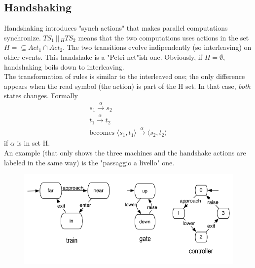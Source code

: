 \documentclass{article}
\begin{document}
			\subsection{Handshaking}
				Handshaking introduces "synch actions" that makes parallel computations synchronize. $TS_1 \,\vert\vert\,_{H} TS_2$ means that the two computations uses actions in the set $H = \subseteq Act_1 \cap Act_2$. The two transitions evolve indipendently (so interleaving) on other events. This handshake is a "Petri net"ish one. Obviously, if $H = \emptyset$, handshaking boils down to interleaving.\\
				The transformation of rules is similar to the interleaved one; the only difference appears when the read symbol (the action) is part of the H set. In that case, \emph{both} states changes. Formally
				\begin{gather}
					s_1 \xrightarrow{\alpha} s_2 \\
					t_1 \xrightarrow{\alpha} t_2 \\
					\text{becomes } \langle s_1, t_1 \rangle \xrightarrow{\alpha} \langle s_2, t_2 \rangle
				\end{gather}
				if $\alpha$ is in set H.\\
				An example (that only shows the three machines and the handshake actions are labeled in the same way) is the "passaggio a livello" one. 
				\begin{figure}[H]
					\centering
					\includegraphics[width = \textwidth]{./images/PAL.png}
				\end{figure}
					
\end{document}
